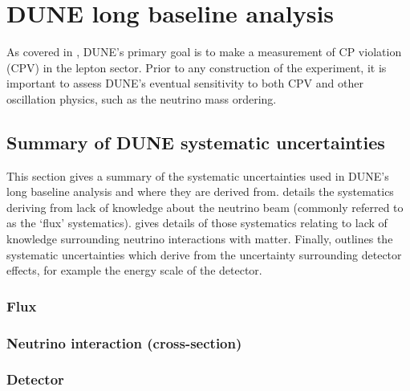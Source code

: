 \chapter{DUNE long baseline analysis}
\label{sec:dune_lbl}

As covered in , DUNE's primary goal is to make a measurement of CP violation (CPV) in the lepton sector.
Prior to any construction of the experiment, it is important to assess DUNE's eventual sensitivity to both CPV and other oscillation physics, such as the neutrino mass ordering.

\section{Summary of DUNE systematic uncertainties}
\label{sec:dune_lbl:systs}

This section gives a summary of the systematic uncertainties used in DUNE's long baseline analysis and where they are derived from.
 details the systematics deriving from lack of knowledge about the neutrino beam (commonly referred to as the `flux' systematics).
 gives details of those systematics relating to lack of knowledge surrounding neutrino interactions with matter.
Finally,  outlines the systematic uncertainties which derive from the uncertainty surrounding detector effects, for example the energy scale of the detector.

\subsection{Flux}
\label{sec:dune_lbl:systs:flux}

\subsection{Neutrino interaction (cross-section)}
\label{sec:dune_lbl:systs:xsec}

\subsection{Detector}
\label{sec:dune_lbl:systs:det}
